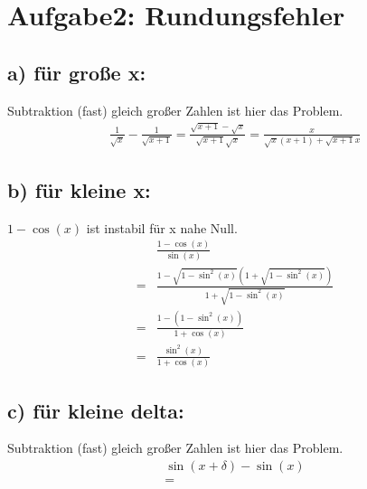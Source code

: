 \newpage
\section{Aufgabe2: Rundungsfehler}
\label{sec:auf2}

\subsection{a) für große x:}

Subtraktion (fast) gleich großer Zahlen ist hier das Problem.
\begin{align}
    \frac{1}{\sqrt{x}} - \frac{1}{\sqrt{x+1}} 
    = \frac{\sqrt{x+1}-\sqrt{x}}{\sqrt{x+1}\sqrt{x}} 
    = \frac{x}{\sqrt{x}\left(x+1\right)+\sqrt{x+1}x}
\end{align}


\subsection{b) für kleine x:}

$1-\cos(x)$ ist instabil für x nahe Null.
\begin{align}
    & \frac{1-\cos(x)}{\sin(x)}\\
    =& \frac{ 1 - \sqrt{1-\sin^2(x)} (1 + \sqrt{1-\sin^2(x)}) }{ 1 + \sqrt{1-\sin^2(x)} }\\
    =& \frac{ 1 - \left( 1-\sin^2(x) \right) }{ 1 + \cos(x)}\\
    =& \frac{ \sin^2(x) }{ 1 + \cos(x)}
\end{align}

\subsection{c) für kleine delta:}

Subtraktion (fast) gleich großer Zahlen ist hier das Problem.
\begin{align}
    \sin(x + \delta) - \sin(x)\\
    = 
\end{align}